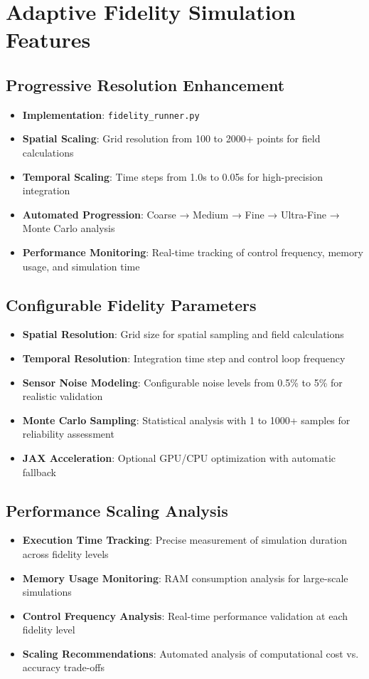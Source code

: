 \documentclass[11pt]{article}
\begin{document}
\section{Adaptive Fidelity Simulation Features}

\subsection{Progressive Resolution Enhancement}
\begin{itemize}
\item \textbf{Implementation}: \texttt{fidelity\_runner.py}
\item \textbf{Spatial Scaling}: Grid resolution from 100 to 2000+ points for field calculations
\item \textbf{Temporal Scaling}: Time steps from 1.0s to 0.05s for high-precision integration
\item \textbf{Automated Progression}: Coarse → Medium → Fine → Ultra-Fine → Monte Carlo analysis
\item \textbf{Performance Monitoring}: Real-time tracking of control frequency, memory usage, and simulation time
\end{itemize}

\subsection{Configurable Fidelity Parameters}
\begin{itemize}
\item \textbf{Spatial Resolution}: Grid size for spatial sampling and field calculations
\item \textbf{Temporal Resolution}: Integration time step and control loop frequency
\item \textbf{Sensor Noise Modeling}: Configurable noise levels from 0.5\% to 5\% for realistic validation
\item \textbf{Monte Carlo Sampling}: Statistical analysis with 1 to 1000+ samples for reliability assessment
\item \textbf{JAX Acceleration}: Optional GPU/CPU optimization with automatic fallback
\end{itemize}

\subsection{Performance Scaling Analysis}
\begin{itemize}
\item \textbf{Execution Time Tracking}: Precise measurement of simulation duration across fidelity levels
\item \textbf{Memory Usage Monitoring}: RAM consumption analysis for large-scale simulations
\item \textbf{Control Frequency Analysis}: Real-time performance validation at each fidelity level
\item \textbf{Scaling Recommendations}: Automated analysis of computational cost vs. accuracy trade-offs
\end{itemize}
\end{document}
